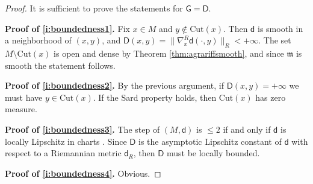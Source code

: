 \documentclass[11pt,a4paper]{article}
\theoremstyle{plain}
\theoremstyle{definition}
\theoremstyle{remark}
\numberwithin{equation}{section}
\newcommand{\Cut}{\mathrm{Cut}}
\newcommand{\mm}{\mathfrak m}
\newcommand{\sfd}{\mathsf d}
\newcommand{\sfD}{\mathsf D}
\newcommand{\sfG}{\mathsf G}
\begin{document}
\begin{proof}
It is sufficient to prove the statements for $\sfG=\sfD$. 

\textbf{Proof of \ref{i:boundedness1}.} Fix $x\in M$ and $y\notin\Cut(x)$. Then $\sfd$ is smooth in a neighborhood of $(x,y)$, and $\sfD(x,y) = \|\nabla^R_x \sfd(\cdot,y)\|_R <+\infty$. The set $M\setminus \Cut(x)$ is open and dense by Theorem \ref{thm:agrariffsmooth}, and since $\mm$ is smooth the statement follows.

\textbf{Proof of \ref{i:boundedness2}.} By the previous argument, if $\sfD(x,y) = +\infty$ we must have $y\in \Cut(x)$. If the Sard property holds, then $\Cut(x)$ has zero measure.

\textbf{Proof of \ref{i:boundedness3}.} The step of $(M,\sfd)$ is $\leq 2$ if and only if $\sfd$ is locally Lipschitz in charts \cite[Cor.\ 6.2]{AAPL-transport}. Since $\sfD$ is the asymptotic Lipschitz constant of $\sfd$ with respect to a Riemannian metric $\sfd_R$, then $\sfD$ must be locally bounded.

\textbf{Proof of \ref{i:boundedness4}.} Obvious.
\end{proof}
\end{document}
